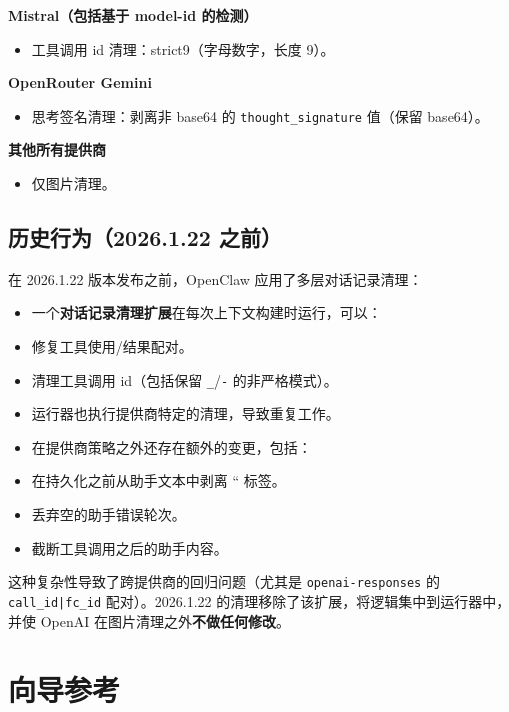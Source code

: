 \textbf{Mistral（包括基于 model-id 的检测）}

\begin{itemize}
  \item 工具调用 id 清理：strict9（字母数字，长度 9）。
\end{itemize}


\textbf{OpenRouter Gemini}

\begin{itemize}
  \item 思考签名清理：剥离非 base64 的 \texttt{thought\_signature} 值（保留 base64）。
\end{itemize}


\textbf{其他所有提供商}

\begin{itemize}
  \item 仅图片清理。
\end{itemize}


\hrulefill


\subsection{历史行为（2026.1.22 之前）}


在 2026.1.22 版本发布之前，OpenClaw 应用了多层对话记录清理：

\begin{itemize}
  \item 一个\textbf{对话记录清理扩展}在每次上下文构建时运行，可以：
  \item 修复工具使用/结果配对。
  \item 清理工具调用 id（包括保留 \texttt{\_}/\texttt{-} 的非严格模式）。
  \item 运行器也执行提供商特定的清理，导致重复工作。
  \item 在提供商策略之外还存在额外的变更，包括：
  \item 在持久化之前从助手文本中剥离 `` 标签。
  \item 丢弃空的助手错误轮次。
  \item 截断工具调用之后的助手内容。
\end{itemize}


这种复杂性导致了跨提供商的回归问题（尤其是 \texttt{openai-responses} 的 \texttt{call\_id|fc\_id} 配对）。2026.1.22 的清理移除了该扩展，将逻辑集中到运行器中，并使 OpenAI 在图片清理之外\textbf{不做任何修改}。


\clearpage

\section{向导参考}


